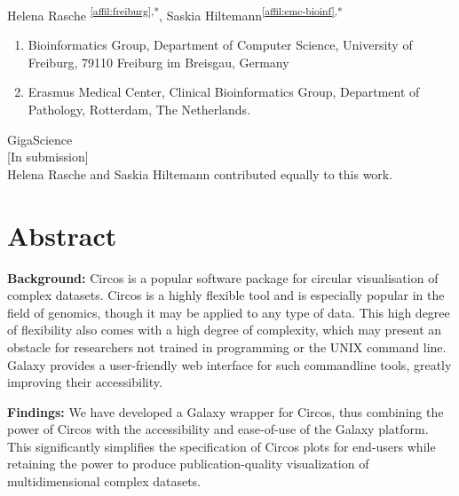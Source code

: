\setcounter{NAT@ctr}{-1}

Helena Rasche \textsuperscript{\ref{affil:freiburg},*},
Saskia Hiltemann\textsuperscript{\ref{affil:emc-bioinf},*}

\small
\begin{enumerate}
 \itemsep-0.5em
 \item Bioinformatics Group, Department of Computer Science, University of Freiburg, 79110 Freiburg im Breisgau, Germany\label{affil:freiburg}
 \item Erasmus Medical Center, Clinical Bioinformatics Group, Department of Pathology, Rotterdam, The Netherlands.\label{affil:emc-bioinf}
\end{enumerate}


{\color{chaptergrey}{Published in:}} GigaScience \\
{\color{chaptergrey}{DOI:}} [In submission] \\
{\color{chaptergrey}{*:}} Helena Rasche and Saskia Hiltemann contributed equally to this work.


\section*{Abstract}

\textbf{Background:} Circos is a popular software package for circular visualisation of complex datasets. Circos is a highly flexible tool and is especially popular in the field of genomics, though it may be applied to any type of data. This high degree of flexibility also comes with a high degree of complexity, which may present an obstacle for researchers not trained in programming or the UNIX command line. Galaxy provides a user-friendly web interface for such commandline tools, greatly improving their accessibility.

\textbf{Findings:} We have developed a Galaxy wrapper for Circos, thus combining the power of Circos with the accessibility and ease-of-use of the Galaxy platform. This significantly simplifies the specification of Circos plots for end-users while retaining the power to produce publication-quality visualization of multidimensional complex datasets.


